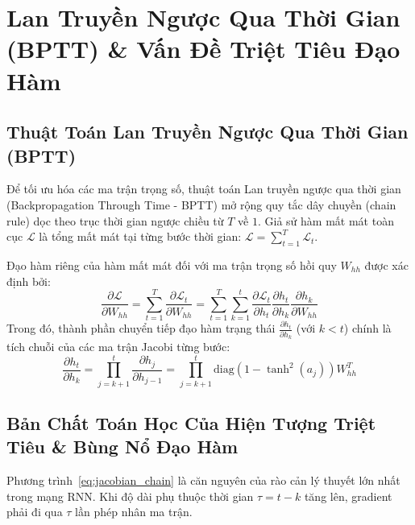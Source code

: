 \documentclass[12pt,a4paper]{report}
\begin{document}
\section{Lan Truyền Ngược Qua Thời Gian (BPTT) \& Vấn Đề Triệt Tiêu Đạo Hàm}
\subsection{Thuật Toán Lan Truyền Ngược Qua Thời Gian (BPTT)}
Để tối ưu hóa các ma trận trọng số, thuật toán Lan truyền ngược qua thời gian (Backpropagation Through Time - BPTT) mở rộng quy tắc dây chuyền (chain rule) dọc theo trục thời gian ngược chiều từ $T$ về $1$. Giả sử hàm mất mát toàn cục $\mathcal{L}$ là tổng mất mát tại từng bước thời gian: $\mathcal{L} = \sum_{t=1}^T \mathcal{L}_t$.

Đạo hàm riêng của hàm mất mát đối với ma trận trọng số hồi quy $W_{hh}$ được xác định bởi:
\begin{equation}
    \frac{\partial \mathcal{L}}{\partial W_{hh}} = \sum_{t=1}^T \frac{\partial \mathcal{L}_t}{\partial W_{hh}} = \sum_{t=1}^T \sum_{k=1}^t \frac{\partial \mathcal{L}_t}{\partial h_t} \frac{\partial h_t}{\partial h_k} \frac{\partial h_k}{\partial W_{hh}}
    \label{eq:bptt_sum}
\end{equation}
Trong đó, thành phần chuyển tiếp đạo hàm trạng thái $\frac{\partial h_t}{\partial h_k}$ (với $k < t$) chính là tích chuỗi của các ma trận Jacobi từng bước:
\begin{equation}
    \frac{\partial h_t}{\partial h_k} = \prod_{j=k+1}^t \frac{\partial h_j}{\partial h_{j-1}} = \prod_{j=k+1}^t \text{diag}\left(1 - \tanh^2(a_j)\right) W_{hh}^T
    \label{eq:jacobian_chain}
\end{equation}

\subsection{Bản Chất Toán Học Của Hiện Tượng Triệt Tiêu \& Bùng Nổ Đạo Hàm}
Phương trình~\eqref{eq:jacobian_chain} là căn nguyên của rào cản lý thuyết lớn nhất trong mạng RNN. Khi độ dài phụ thuộc thời gian $\tau = t - k$ tăng lên, gradient phải đi qua $\tau$ lần phép nhân ma trận. 
\end{document}
